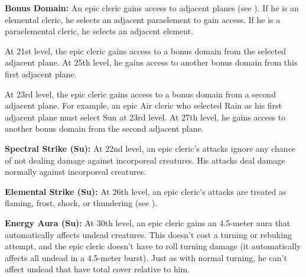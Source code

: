 \textbf{Bonus Domain:} An epic cleric gains access to adjacent planes (see ). If he is an elemental cleric, he selects an adjacent paraelement to gain access. If he is a paraelemental cleric, he selects an adjacent element.

At 21st level, the epic cleric gains access to a bonus domain from the selected adjacent plane. At 25th level, he gains access to another bonus domain from this first adjacent plane.

At 23rd level, the epic cleric gains access to a bonus domain from a second adjacent plane. For example, an epic Air cleric who selected Rain as his first adjacent plane must select Sun at 23rd level. At 27th level, he gains access to another bonus domain from the second adjacent plane.


\textbf{Spectral Strike (Su):} At 22nd level, an epic cleric's attacks ignore any chance of not dealing damage against incorporeal creatures. His attacks deal damage normally against incorporeal creatures.

\textbf{Elemental Strike (Su):} At 26th level, an epic cleric's attacks are treated as flaming, frost, shock, or thundering (see ).


\textbf{Energy Aura (Su):} At 30th level, an epic cleric gains an 4.5-meter aura that automatically affects undead creatures. This doesn't cost a turning or rebuking attempt, and the epic cleric doesn't have to roll turning damage (it automatically affects all undead in a 4.5-meter burst). Just as with normal turning, he can't affect undead that have total cover relative to him.


